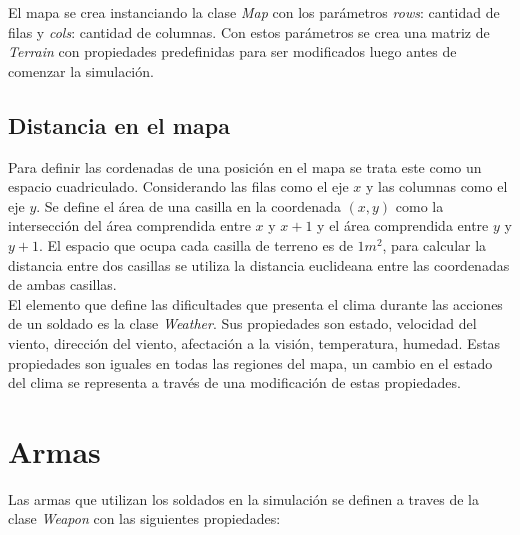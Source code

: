 \documentclass[twoside]{article}
\begin{document}
El mapa se crea instanciando la clase \emph{Map} con los par\'ametros \emph{rows}: cantidad de filas y \emph{cols}: cantidad de columnas. Con estos par\'ametros se crea una matriz de \emph{Terrain} con propiedades predefinidas para ser modificados luego antes de comenzar la simulaci\'on.

\subsection{Distancia en el mapa}

Para definir las cordenadas de una posici\'on en el mapa se trata este como un espacio cuadriculado. Considerando las filas como el eje $x$ y las columnas como el eje $y$. Se define el \'area de una casilla en la coordenada $(x, y)$ como la intersecci\'on del \'area comprendida entre $x$ y $x+1$ y el \'area comprendida entre $y$ y $y+1$.
El espacio que ocupa cada casilla de terreno es de $1 m^2$, para calcular la distancia entre dos casillas se utiliza la distancia euclideana entre las coordenadas de ambas casillas.\\

El elemento que define las dificultades que presenta el clima durante las acciones de un soldado es la clase \emph{Weather}. Sus propiedades son estado, velocidad del viento, direcci\'on del viento, afectaci\'on a la visi\'on, temperatura, humedad. Estas propiedades son iguales en todas las regiones del mapa, un cambio en el estado del clima se representa a trav\'es de una modificaci\'on de estas propiedades.

\section{Armas}

Las armas que utilizan los soldados en la simulaci\'on se definen a traves de la clase \emph{Weapon} con las siguientes propiedades: 
\end{document}
